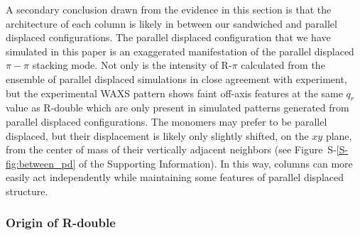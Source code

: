 \documentclass[journal=jpcbfk,manuscript=article]{achemso}
\begin{document}
  A secondary conclusion drawn from the evidence in this section is 
  that the architecture of each column is likely in between our sandwiched
  and parallel displaced configurations. The parallel displaced configuration 
  that we have simulated in this paper is an exaggerated manifestation of the 
  parallel displaced $\pi-\pi$ stacking mode. Not only is the intensity of R-$\pi$
  calculated from the ensemble of parallel displaced simulations in close agreement
  with experiment, but the experimental WAXS pattern shows faint off-axis features
  at the same $q_r$ value as R-double which are only present in simulated patterns
  generated from parallel displaced configurations. The monomers may prefer to be
  parallel displaced, but their displacement is likely only slightly shifted, on 
  the $xy$ plane, from the center of mass of their vertically adjacent neighbors 
  (see Figure~S-\ref{S-fig:between_pd} of the Supporting Information). In this way,
  columns can more easily act 
  independently while maintaining some features of parallel displaced structure. 


  \subsubsection{Origin of R-double}\label{section:rdouble}
  
\end{document}
